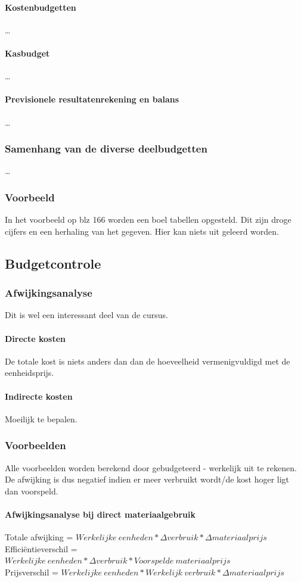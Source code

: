 \documentclass[12pt]{article}
\begin{document}
\paragraph{Kostenbudgetten}
\dots
\paragraph{Kasbudget}
\dots
\paragraph{Previsionele resultatenrekening en balans}
\dots
\subsubsection{Samenhang van de diverse deelbudgetten}
\dots
\subsubsection{Voorbeeld}
In het voorbeeld op blz 166 worden een boel tabellen opgesteld. Dit zijn droge cijfers en een herhaling van het gegeven. Hier kan niets uit geleerd worden.
\subsection{Budgetcontrole}
\subsubsection{Afwijkingsanalyse}
Dit is wel een interessant deel van de cursus.
\paragraph{Directe kosten}
De totale kost is niets anders dan dan de hoeveelheid vermenigvuldigd met de eenheidsprijs.
\paragraph{Indirecte kosten}
Moeilijk te bepalen.
\subsubsection{Voorbeelden}
Alle voorbeelden worden berekend door gebudgeteerd - werkelijk uit te rekenen. De afwijking is dus negatief indien er meer verbruikt wordt/de kost hoger ligt dan voorspeld.
\paragraph{Afwijkingsanalyse bij direct materiaalgebruik}
\begin{center}
Totale afwijking = $Werkelijke\ eenheden * \Delta verbruik * \Delta materiaalprijs$\\
Effici\"entieverschil = $Werkelijke\ eenheden * \Delta verbruik * Voorspelde\ materiaalprijs$\\
Prijsverschil = $Werkelijke\ eenheden * Werkelijk\ verbruik * \Delta materiaalprijs$
\end{center}
\end{document}
